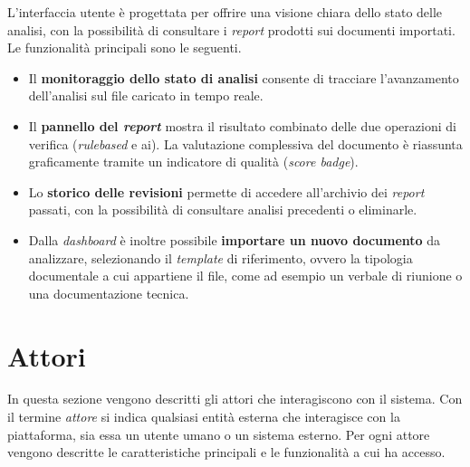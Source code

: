 L'interfaccia utente è progettata per offrire una visione chiara dello stato delle analisi, con la possibilità di consultare i \emph{report} prodotti sui documenti importati. Le funzionalità principali sono le seguenti.

\begin{itemize}
    \item Il \textbf{monitoraggio dello stato di analisi} consente di tracciare l'avanzamento dell'analisi sul file caricato in tempo reale.
    \item Il \textbf{pannello del \emph{report}} mostra il risultato combinato delle due operazioni di verifica (\emph{\gls{rulebased}} e \gls{ai}). La valutazione complessiva del documento è riassunta graficamente tramite un indicatore di qualità (\emph{score badge}).
    \item Lo \textbf{storico delle revisioni} permette di accedere all'archivio dei \emph{report} passati, con la possibilità di consultare analisi precedenti o eliminarle.
    \item Dalla \emph{dashboard} è inoltre possibile \textbf{importare un nuovo documento} da analizzare, selezionando il \emph{template} di riferimento, ovvero la tipologia documentale a cui appartiene il file, come ad esempio un verbale di riunione o una documentazione tecnica.
\end{itemize}



\newpage
\section{Attori}

In questa sezione vengono descritti gli attori che interagiscono con il sistema. Con il termine \emph{attore} si indica qualsiasi entità esterna che interagisce con la piattaforma, sia essa un utente umano o un sistema esterno. Per ogni attore vengono descritte le caratteristiche principali e le funzionalità a cui ha accesso.


